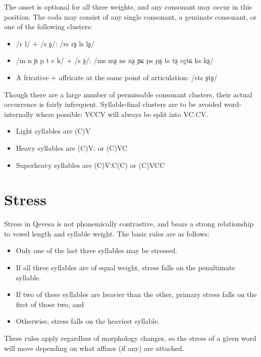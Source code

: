 \documentclass[grammar]{subfiles}
\begin{document}
The onset is optional for all three weights, and any consonant may occur in
this position.  The coda may consist of any single consonant, a geminate
consonant, or one of the following clusters:

\begin{itemize}
  \item /r l/ + /s ʂ/: /rs rʂ ls lʂ/
  \item /m n ɲ p t c k/ + /s ʂ/: /ms mʂ ns nʂ ɲɕ ps pʂ ts tʂ cç\tlde tɕ ks kʂ/
  \item A fricative + affricate at the same point of articulation: /sts ʂtʂ/
\end{itemize}

Though there are a large number of permissable consonant clusters, their actual
occurrence is fairly infrequent.  Syllable-final clusters are to be avoided
word-internally where possible: VCCV will always be split into VC.CV\@. 

\begin{itemize}
  \item Light syllables are (C)V
  \item Heavy syllables are (C)Vː or (C)VC
  \item Superheavy syllables are (C)VːC(C) or (C)VCC
\end{itemize}

\section{Stress}
\label{sec:stress}

Stress in Qevesa is not phonemically contrastive, and bears a strong
relationship to vowel length and syllable weight.  The basic rules are as
follows: 

\begin{itemize}
  \item Only one of the last three syllables may be stressed.
  \item If all three syllables are of equal weight, stress falls on the penultimate syllable.
  \item If two of these syllables are heavier than the other, primary stress falls on the first of those two, and 
  \item Otherwise, stress falls on the heaviest syllable.
\end{itemize}

These rules apply regardless of morphology changes, so the stress of a given
word will move depending on what affixes (if any) are attached.
\end{document}
